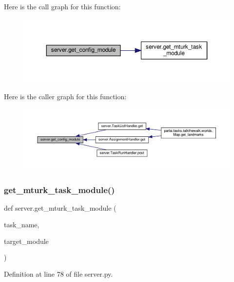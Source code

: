 Here is the call graph for this function\+:
\nopagebreak
\begin{figure}[H]
\begin{center}
\leavevmode
\includegraphics[width=350pt]{namespaceserver_a2467b58afe94f16856770faf20184b7b_cgraph}
\end{center}
\end{figure}
Here is the caller graph for this function\+:
\nopagebreak
\begin{figure}[H]
\begin{center}
\leavevmode
\includegraphics[width=350pt]{namespaceserver_a2467b58afe94f16856770faf20184b7b_icgraph}
\end{center}
\end{figure}
\mbox{\label{namespaceserver_a20f5670b2d0cc9c06be867b56798550d}} 
\subsubsection{\texorpdfstring{get\+\_\+mturk\+\_\+task\+\_\+module()}{get\_mturk\_task\_module()}}
{\footnotesize\ttfamily def server.\+get\+\_\+mturk\+\_\+task\+\_\+module (\begin{DoxyParamCaption}\item[{}]{task\+\_\+name,  }\item[{}]{target\+\_\+module }\end{DoxyParamCaption})}



Definition at line 78 of file server.\+py.



